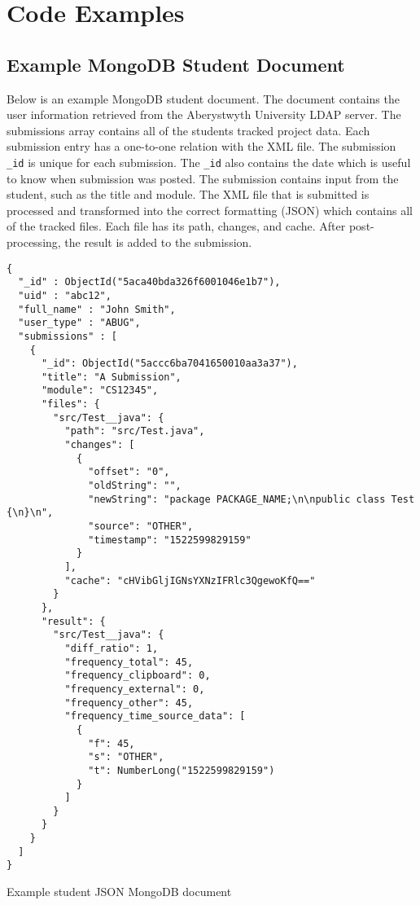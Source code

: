 \chapter{Code Examples}
\label{chp:code-examples}
\section{Example MongoDB Student Document}
\label{sec:mongodb-student-document}

Below is an example MongoDB student document. The document contains the user information retrieved from the Aberystwyth University LDAP server. The submissions array contains all of the students tracked project data. Each submission entry has a one-to-one relation with the XML file. The submission \texttt{\_id} is unique for each submission. The \texttt{\_id} also contains the date which is useful to know when submission was posted. The submission contains input from the student, such as the title and module. The XML file that is submitted is processed and transformed into the correct formatting (JSON) which contains all of the tracked files. Each file has its path, changes, and cache. After post-processing, the result is added to the submission. 

\begin{code}
\begin{verbatim}
{
  "_id" : ObjectId("5aca40bda326f6001046e1b7"),
  "uid" : "abc12",
  "full_name" : "John Smith",
  "user_type" : "ABUG",
  "submissions" : [
    {
      "_id": ObjectId("5accc6ba7041650010aa3a37"),
      "title": "A Submission",
      "module": "CS12345",
      "files": {
        "src/Test__java": {
          "path": "src/Test.java",
          "changes": [
            {
              "offset": "0",
              "oldString": "",
              "newString": "package PACKAGE_NAME;\n\npublic class Test {\n}\n",
              "source": "OTHER",
              "timestamp": "1522599829159"
            }
          ],
          "cache": "cHVibGljIGNsYXNzIFRlc3QgewoKfQ=="
        }
      },
      "result": {
        "src/Test__java": {
          "diff_ratio": 1,
          "frequency_total": 45,
          "frequency_clipboard": 0,
          "frequency_external": 0,
          "frequency_other": 45,
          "frequency_time_source_data": [
            {
              "f": 45,
              "s": "OTHER",
              "t": NumberLong("1522599829159")
            }
          ]
        }
      }
    }
  ]
}
\end{verbatim}
\caption{Example student JSON MongoDB document}
\label{cde:example-student-document}
\end{code}
